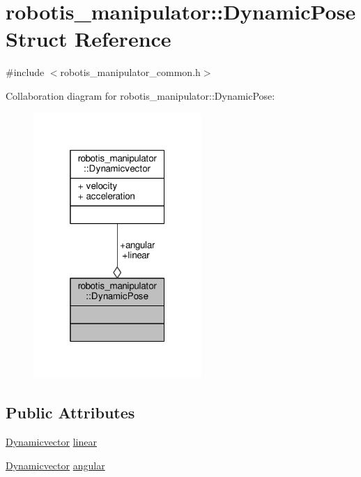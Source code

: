 \hypertarget{structrobotis__manipulator_1_1_dynamic_pose}{}\section{robotis\+\_\+manipulator\+:\+:Dynamic\+Pose Struct Reference}
\label{structrobotis__manipulator_1_1_dynamic_pose}


{\ttfamily \#include $<$robotis\+\_\+manipulator\+\_\+common.\+h$>$}



Collaboration diagram for robotis\+\_\+manipulator\+:\+:Dynamic\+Pose\+:\nopagebreak
\begin{figure}[H]
\begin{center}
\leavevmode
\includegraphics[width=181pt]{structrobotis__manipulator_1_1_dynamic_pose__coll__graph}
\end{center}
\end{figure}
\subsection*{Public Attributes}
\begin{DoxyCompactItemize}
\item 
\hyperlink{structrobotis__manipulator_1_1_dynamicvector}{Dynamicvector} \hyperlink{structrobotis__manipulator_1_1_dynamic_pose_a45f314d8e2d3f78a4bc9c2aa72f0badc}{linear}
\item 
\hyperlink{structrobotis__manipulator_1_1_dynamicvector}{Dynamicvector} \hyperlink{structrobotis__manipulator_1_1_dynamic_pose_a424459b0d1108f1e65594f5d193cbae6}{angular}
\end{DoxyCompactItemize}


